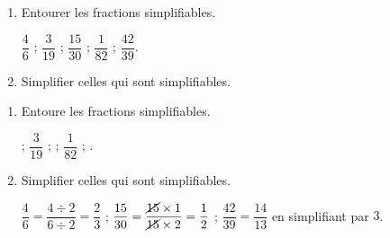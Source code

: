 \begin{exercice*}
    \begin{enumerate}
        \item Entourer les fractions simplifiables.
        
        \smallskip        
        $\dfrac{4}{6}$ ; $\dfrac{3}{19}$ ; $\dfrac{15}{30}$ ; $\dfrac{1}{82}$ ; $\dfrac{42}{39}$.
        \smallskip
        \item Simplifier celles qui sont simplifiables.
    \end{enumerate}
\end{exercice*}
\begin{corrige}
    \begin{enumerate}
        \item Entoure les fractions simplifiables.
        
        \smallskip        
         ; $\dfrac{3}{19}$ ;  ; $\dfrac{1}{82}$ ; .
        \smallskip

        \item Simplifier celles qui sont simplifiables.
        
        $\dfrac{4}{6}=\dfrac{4\div 2}{6\div 2}=\dfrac{2}{3}$ ; $\dfrac{15}{30}=\dfrac{\cancel{15}\times 1}{\cancel{15}\times 2}=\dfrac{1}{2}$ ; 
        $\dfrac{42}{39}=\dfrac{14}{13}$ en simplifiant par $3$.
    \end{enumerate}
\end{corrige}

